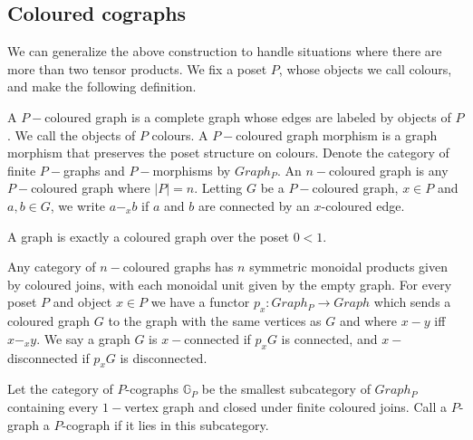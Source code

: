 \subsection{Coloured cographs}
We can generalize the above construction to handle situations where there are more than two tensor products. We fix a poset $P$, whose objects we call colours, and make the following definition.

\begin{definition}
    A $P-$coloured graph is a complete graph whose edges are labeled by objects of $P$. We call the objects of $P$ colours. A $P-$coloured graph morphism is a graph morphism that preserves the poset structure on colours. Denote the category of finite $P-$graphs and $P-$morphisms by $Graph_P$. An $n-$coloured graph is any $P-$coloured graph where $|P|=n.$ Letting $G$ be a $P-$coloured graph, $x\in P$ and $a,b\in G$, we write $a-_xb$ if $a$ and $b$ are connected by an $x$-coloured edge.
\end{definition}

\begin{remark}
    A graph is exactly a coloured graph over the poset $0<1.$
\end{remark}

Any category of $n-$coloured graphs has $n$ symmetric monoidal products given by coloured joins, with each monoidal unit given by the empty graph. 
For every poset $P$ and object $x\in P$ we have a functor $p_x:Graph_P\rightarrow Graph$ which sends a coloured graph $G$ to the graph with the same vertices as $G$ and where $x-y$ iff $x-_x y$. We say a graph $G$ is $x-$connected if $p_xG$ is connected, and $x-$disconnected if $p_xG$ is disconnected.

\begin{definition} 
Let the category of $P$-cographs $\mathbb{G}_P$ be the smallest subcategory of $Graph_P$ containing every $1-$vertex graph and closed under finite coloured joins. Call a $P$-graph a $P$-cograph if it lies in this subcategory.
\end{definition}

